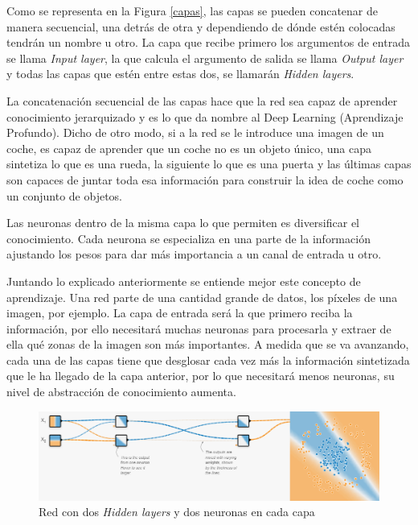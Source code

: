 \begin{itemize}
    Como se representa en la Figura \ref{capas}, las capas se pueden concatenar de manera secuencial, una detrás de otra y dependiendo de dónde estén colocadas tendrán un nombre u otro. La capa que recibe primero los argumentos de entrada se llama \textit{Input layer}, la que calcula el argumento de salida se llama \textit{Output layer} y todas las capas que estén entre estas dos, se llamarán \textit{Hidden layers}. 
    
    La concatenación secuencial de las capas hace que la red sea capaz de aprender conocimiento jerarquizado y es lo que da nombre al Deep Learning (Aprendizaje Profundo). Dicho de otro modo, si a la red se le introduce una imagen de un coche, es capaz de aprender que un coche no es un objeto único, una capa sintetiza lo que es una rueda, la siguiente lo que es una puerta y las últimas capas son capaces de juntar toda esa información para construir la idea de coche como un conjunto de objetos.
    
    Las neuronas dentro de la misma capa lo que permiten es diversificar el conocimiento. Cada neurona se especializa en una parte de la información ajustando los pesos para dar más importancia a un canal de entrada u otro.
    
    Juntando lo explicado anteriormente se entiende mejor este concepto de aprendizaje. Una red parte de una cantidad grande de datos, los píxeles de una imagen, por ejemplo. La capa de entrada será la que primero reciba la información, por ello necesitará muchas neuronas para procesarla y extraer de ella qué zonas de la imagen son más importantes. A medida que se va avanzando, cada una de las capas tiene que desglosar cada vez más la información sintetizada que le ha llegado de la capa anterior, por lo que necesitará menos neuronas, su nivel de abstracción de conocimiento aumenta.
    
    \begin{figure}[h!]
        \centering
        \includegraphics[width=135mm, angle=0]{2/Fotos/capas.png}
        \captionsetup{justification=centering,margin=1.25cm}
        \caption{Red con dos \textit{Hidden layers} y dos neuronas en cada capa}
        \label{aplicacion_capas}
    \end{figure}
    

\end{itemize}
